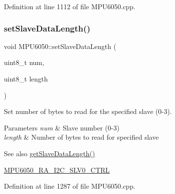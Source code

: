Definition at line 1112 of file M\+P\+U6050.\+cpp.


\begin{DoxyCode}{0}

\end{DoxyCode}
\mbox{\label{classMPU6050_ab4151353f433c533246d938fc3b78458}} 
\subsubsection{\texorpdfstring{setSlaveDataLength()}{setSlaveDataLength()}}
{\footnotesize\ttfamily void M\+P\+U6050\+::set\+Slave\+Data\+Length (\begin{DoxyParamCaption}\item[{uint8\+\_\+t}]{num,  }\item[{uint8\+\_\+t}]{length }\end{DoxyParamCaption})}

Set number of bytes to read for the specified slave (0-\/3). 
\begin{DoxyParams}{Parameters}
{\em num} & Slave number (0-\/3) \\
\hline
{\em length} & Number of bytes to read for specified slave \\
\hline
\end{DoxyParams}
\begin{DoxySeeAlso}{See also}
\mbox{\hyperlink{classMPU6050_a54c2a48b3cb79106bcaf75accf6cd311}{get\+Slave\+Data\+Length()}} 

\mbox{\hyperlink{MPU6050_8h_a70ce4d71982a1e3fb2be9b71f40da786}{M\+P\+U6050\+\_\+\+R\+A\+\_\+\+I2\+C\+\_\+\+S\+L\+V0\+\_\+\+C\+T\+RL}} 
\end{DoxySeeAlso}


Definition at line 1287 of file M\+P\+U6050.\+cpp.


